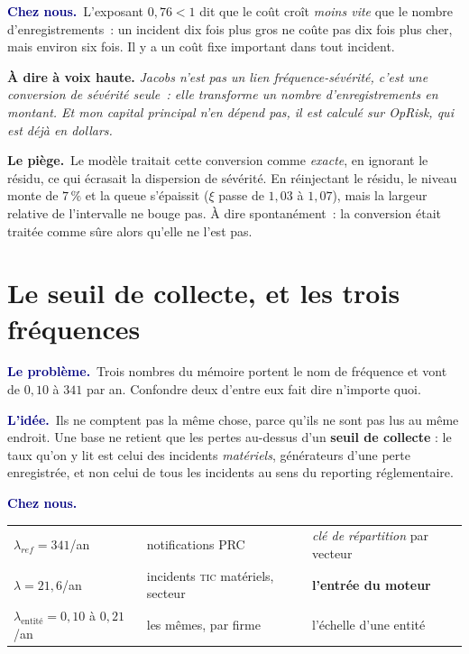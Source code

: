 \documentclass[11pt,a4paper]{article}
\newcommand{\lequoi}[1]{\smallskip\noindent\textcolor{navy}{\textbf{Le problème.}}\ #1\par}
\newcommand{\lidee}[1]{\smallskip\noindent\textcolor{navy}{\textbf{L'idée.}}\ #1\par}
\newcommand{\cheznous}[1]{\smallskip\noindent\textcolor{navy}{\textbf{Chez nous.}}\ #1\par}
\newcommand{\lepiege}[1]{\smallskip\noindent\textcolor{accent}{\textbf{Le piège.}}\ #1\par}
\newcommand{\laphrase}[1]{\begin{phrasebox}\textbf{À dire à voix haute.} \emph{#1}\end{phrasebox}}
\begin{document}
\cheznous{L'exposant $0{,}76 < 1$ dit que le coût croît \emph{moins vite} que le nombre
d'enregistrements~: un incident dix fois plus gros ne coûte pas dix fois plus cher, mais
environ six fois. Il y a un coût fixe important dans tout incident.}

\laphrase{Jacobs n'est pas un lien fréquence-sévérité, c'est une conversion de sévérité
seule~: elle transforme un nombre d'enregistrements en montant. Et mon capital principal
n'en dépend pas, il est calculé sur OpRisk, qui est déjà en dollars.}

\lepiege{Le modèle traitait cette conversion comme \emph{exacte}, en ignorant le résidu, ce
qui écrasait la dispersion de sévérité. En réinjectant le résidu, le niveau monte de
$7\,\%$ et la queue s'épaissit ($\xi$ passe de $1{,}03$ à $1{,}07$), mais la largeur
relative de l'intervalle ne bouge pas. À dire spontanément~: la conversion était traitée
comme sûre alors qu'elle ne l'est pas.}

\section{Le seuil de collecte, et les trois fréquences}

\lequoi{Trois nombres du mémoire portent le nom de \og{}fréquence\fg{} et vont de $0{,}10$ à
$341$ par an. Confondre deux d'entre eux fait dire n'importe quoi.}

\lidee{Ils ne comptent pas la même chose, parce qu'ils ne sont pas lus au même endroit. Une
base ne retient que les pertes au-dessus d'un \textbf{seuil de collecte} : le taux qu'on y lit
est celui des incidents \emph{matériels}, générateurs d'une perte enregistrée, et non celui de
tous les incidents au sens du reporting réglementaire.}

\cheznous{\;\\[-6pt]
\begin{center}\small
\begin{tabular}{@{}l l l@{}}
\toprule
$\lambda_{ref}=341$/an & notifications PRC & \emph{clé de répartition} par vecteur \\
$\lambda=21{,}6$/an & incidents \textsc{tic} matériels, secteur & \textbf{l'entrée du moteur} \\
$\lambda_{\text{entité}}=0{,}10$ à $0{,}21$/an & les mêmes, par firme & l'échelle d'une entité \\
\bottomrule
\end{tabular}
\end{center}}
\end{document}
